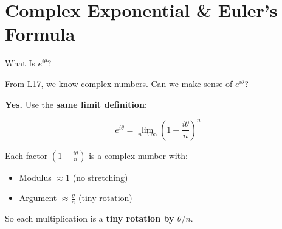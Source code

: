 \documentclass[10pt]{beamer}
\theoremstyle{definition}
\newcommand{\x}[1]{\alert{\textbf{#1}}}
\begin{document}
\section{Complex Exponential \& Euler's Formula}


\begin{frame}{What Is $e^{i\theta}$?}

From L17, we know complex numbers. Can we make sense of $e^{i\theta}$?

\vfill\pause

\textbf{Yes.} Use the \x{same limit definition}:

$$e^{i\theta} = \lim_{n\to\infty}\left(1 + \frac{i\theta}{n}\right)^n$$

\vfill\pause

Each factor $\left(1 + \frac{i\theta}{n}\right)$ is a complex number with:
\begin{itemize}
\item Modulus $\approx 1$ \;\;(no stretching)
\item Argument $\approx \frac{\theta}{n}$ \;\;(tiny rotation)
\end{itemize}

\vfill

So each multiplication is a \x{tiny rotation by $\theta/n$}.

\end{frame}
\end{document}
